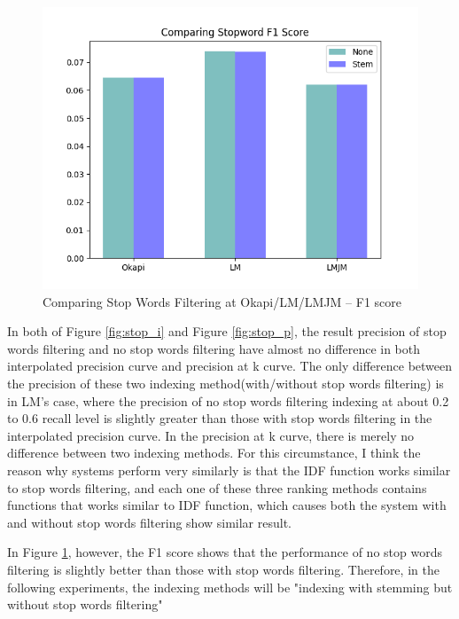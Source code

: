 \documentclass[10pt, a4paper]{article}
\begin{document}
\begin{figure}[h!]
\centering
\includegraphics[scale=0.4]{compare stop/Comparing Stopword F1 Score.png}
\caption{Comparing Stop Words Filtering at Okapi/LM/LMJM -- F1 score}
\label{fig:stop_f}
\end{figure}

In both of Figure \ref{fig:stop_i} and Figure \ref{fig:stop_p}, the result precision of stop words filtering and no stop words filtering have almost no difference in both interpolated precision curve and precision at k curve. The only difference between the precision of these two indexing method(with/without stop words filtering) is in LM's case, where the precision of no stop words filtering indexing at about 0.2 to 0.6 recall level is slightly greater than those with stop words filtering in the interpolated precision curve. In the precision at k curve, there is merely no difference between two indexing methods. For this circumstance, I think the reason why systems perform very similarly is that the IDF function works similar to stop words filtering, and each one of these three ranking methods contains functions that works similar to IDF function, which causes both the system with and without stop words filtering show similar result.

In Figure \ref{fig:stop_f}, however, the F1 score shows that the performance of no stop words filtering is slightly better than those with stop words filtering. Therefore, in the following experiments, the indexing methods will be "indexing with stemming but without stop words filtering"
\end{document}

